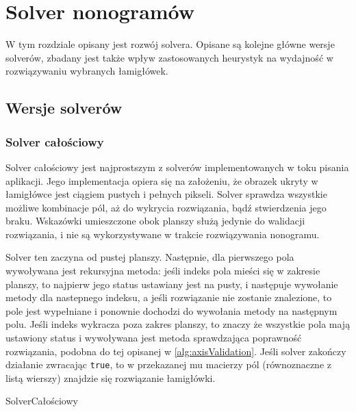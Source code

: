 \chapter{Solver nonogramów}
\thispagestyle{chapterBeginStyle}

    W tym rozdziale opisany jest rozwój solvera. Opisane są kolejne główne wersje solverów, zbadany
jest także wpływ zastosowanych heurystyk na wydajność w rozwiązywaniu wybranych łamigłówek.



\section{Wersje solverów}


\subsection{Solver całościowy}
    Solver całościowy jest najprostszym z solverów implementowanych w toku pisania aplikacji. Jego
implementacja opiera się na założeniu, że obrazek ukryty w łamigłówce jest ciągiem pustych i pełnych
pikseli. Solver sprawdza wszystkie możliwe kombinacje pól, aż do wykrycia rozwiązania, bądź stwierdzenia
jego braku. Wskazówki umieszczone obok planszy służą jedynie do walidacji rozwiązania, i nie są
wykorzystywane w trakcie rozwiązywania nonogramu.

    Solver ten zaczyna od pustej planszy. Następnie, dla pierwszego pola wywoływana jest rekursyjna
metoda: jeśli indeks pola mieści się w zakresie planszy, to najpierw jego status ustawiany jest na
pusty, i następuje wywołanie metody dla nastepnego indeksu, a jeśli rozwiązanie nie zostanie znalezione,
to pole jest wypełniane i ponownie dochodzi do wywołania metody na następnym polu. Jeśli indeks
wykracza poza zakres planszy, to znaczy że wszystkie pola mają ustawiony status i wywoływana jest
metoda sprawdzająca poprawność rozwiązania, podobna do tej opisanej w \ref{alg:axisValidation}.
Jeśli solver zakończy działanie zwracając \texttt{true}, to w przekazanej mu macierzy pól 
(równoznaczne z listą wierszy) znajdzie się rozwiązanie łamigłówki.

\begin{pseudokod}[H]
    \caption{SolverCałościowy}\label{alg:allSolver}
\end{pseudokod}

